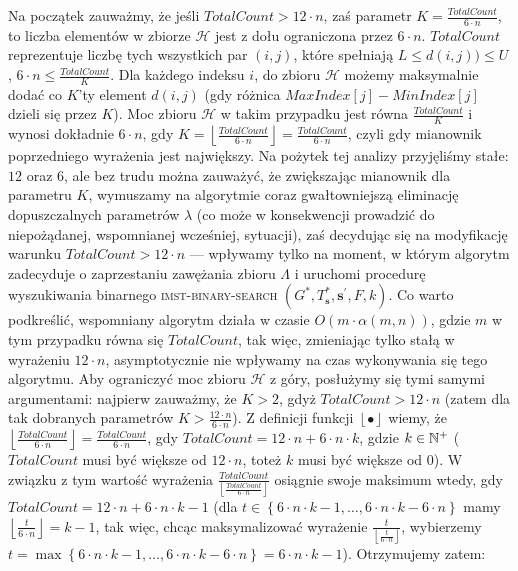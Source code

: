 Na początek zauważmy, że jeśli $TotalCount > 12 \cdot n$, zaś parametr $K = \frac{TotalCount}{6 \cdot n}$, to liczba elementów w zbiorze $\mathcal{H}$ jest z dołu ograniczona przez $6 \cdot n$. $TotalCount$ reprezentuje liczbę tych wszystkich par $\left( i, j \right)$, które spełniają $L \leqslant d \left( i, j \right)) \leqslant U$, $6 \cdot n \leqslant \frac{TotalCount}{K}$. Dla każdego indeksu $i$, do zbioru $\mathcal{H}$ możemy maksymalnie dodać co $K$'ty element $d \left( i, j \right)$ (gdy różnica $MaxIndex \left[ j \right] - MinIndex \left[ j \right]$ dzieli się przez $K$). Moc zbioru $\mathcal{H}$ w takim przypadku jest równa $\frac{TotalCount}{K}$ i wynosi dokładnie $6 \cdot n$, gdy $K = \left\lfloor \frac{TotalCount}{6 \cdot n} \right\rfloor = \frac{TotalCount}{6 \cdot n}$, czyli gdy mianownik poprzedniego wyrażenia jest największy. Na pożytek tej analizy przyjęliśmy stałe: $12$ oraz $6$, ale bez trudu można zauważyć, że zwiększając mianownik dla parametru $K$, wymuszamy na algorytmie coraz gwałtowniejszą eliminację dopuszczalnych parametrów $\lambda$ (co może w konsekwencji prowadzić do niepożądanej, wspomnianej wcześniej, sytuacji), zaś decydując się na modyfikację warunku $TotalCount > 12 \cdot n$ --- wpływamy tylko na moment, w którym algorytm zadecyduje o zaprzestaniu zawężania zbioru $\Lambda$ i uruchomi procedurę wyszukiwania binarnego \textsc{imst-binary-search} $\left( G^{\ast}, T^{\ast}_{\textbf{s}}, \textbf{s}^{\prime}, F, k \right)$. Co warto podkreślić, wspomniany algorytm działa w czasie $O \left( m \cdot \alpha \left( m, n \right) \right)$, gdzie $m$ w tym przypadku równa się $TotalCount$, tak więc, zmieniając tylko stałą w wyrażeniu $12 \cdot n$, asymptotycznie nie wpływamy na czas wykonywania się tego algorytmu. Aby ograniczyć moc zbioru $\mathcal{H}$ z góry, posłużymy się tymi samymi argumentami: najpierw zauważmy, że $K > 2$, gdyż $TotalCount > 12 \cdot n$ (zatem dla tak dobranych parametrów $K > \frac{12 \cdot n}{6 \cdot n}$). Z definicji funkcji $\left\lfloor \bullet \right\rfloor$ wiemy, że $\left\lfloor \frac{TotalCount}{6 \cdot n} \right\rfloor = \frac{TotalCount}{6 \cdot n}$, gdy $TotalCount = 12 \cdot n + 6 \cdot n \cdot k$, gdzie $k \in \mathbb{N}^{+}$ ($TotalCount$ musi być większe od $12 \cdot n$, toteż $k$ musi być większe od $0$). W związku z tym wartość wyrażenia $\frac{TotalCount}{\left\lfloor \frac{TotalCount}{6 \cdot n} \right\rfloor}$ osiągnie swoje maksimum wtedy, gdy $TotalCount = 12 \cdot n + 6 \cdot n \cdot k - 1$ (dla $t \in \left\{ 6 \cdot n \cdot k - 1, \dots, 6 \cdot n \cdot k - 6 \cdot n \right\}$ mamy $\left\lfloor \frac{t}{6 \cdot n} \right\rfloor = k - 1$, tak więc, chcąc maksymalizować wyrażenie $\frac{t}{\left\lfloor \frac{t}{6 \cdot n} \right\rfloor}$, wybierzemy $t = \max \left\{ 6 \cdot n \cdot k - 1, \dots, 6 \cdot n \cdot k - 6 \cdot n \right\} = 6 \cdot n \cdot k - 1$). Otrzymujemy zatem:

